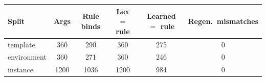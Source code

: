 \begin{tabular}{lccccc}
\toprule
Split & Args & Rule binds & Lex $=$ rule & Learned $=$ rule & Regen.\ mismatches \\
\midrule
template & 360 & 290 & 360 & 275 & 0 \\
environment & 360 & 271 & 360 & 246 & 0 \\
instance & 1200 & 1036 & 1200 & 984 & 0 \\
\bottomrule
\end{tabular}
